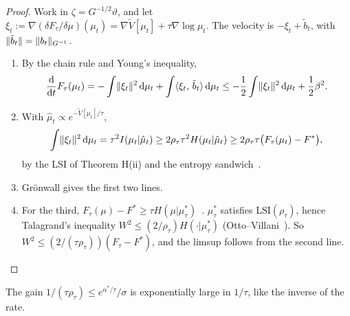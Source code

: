 \begin{proof}
Work in $\zeta=G^{-1/2}\vartheta$, and let
$\xi_t := \nabla(\delta F_\tau/\delta\mu)(\mu_t) = \nabla\tilde V[\mu_t] + \tau\nabla\log\mu_t$. The velocity is
$-\xi_t+\tilde b_t$, with $\lVert \tilde b_t\rVert = \lVert b_t\rVert_{G^{-1}}$.
\begin{enumerate}[label=\arabic*.]
  \item By the chain rule and Young's inequality,
    \[
      \frac{\mathrm{d}}{\mathrm{d}t}F_\tau(\mu_t) = -\int\lVert \xi_t\rVert^2\,\mathrm{d}\mu_t + \int\langle \xi_t,\, \tilde b_t\rangle\,\mathrm{d}\mu_t
      \le -\frac12\int\lVert \xi_t\rVert^2\,\mathrm{d}\mu_t + \frac12\beta^2.
    \]
  \item With $\hat\mu_t\propto e^{-\tilde V[\mu_t]/\tau}$,
    \[
      \int\lVert \xi_t\rVert^2\,\mathrm{d}\mu_t = \tau^2 I(\mu_t|\hat\mu_t) \ge 2\rho_\tau\tau^2 H(\mu_t|\hat\mu_t)
      \ge 2\rho_\tau\tau\bigl(F_\tau(\mu_t)-F^*\bigr),
    \]
    by the LSI of Theorem H(ii) and the entropy sandwich~\cite[Lemma~3.4]{S3}.
  \item Grönwall gives the first two lines.
  \item For the third, $F_\tau(\mu)-F^*\ge\tau H(\mu|\mu^*_\tau)$~\cite[Lemma~3.4]{S3}. $\mu^*_\tau$ satisfies
    $\mathrm{LSI}(\rho_\tau)$, hence Talagrand's inequality $W^2\le(2/\rho_\tau)H(\cdot|\mu^*_\tau)$
    (Otto--Villani~\cite{ov2000}). So $W^2\le(2/(\tau\rho_\tau))(F_\tau-F^*)$, and the limsup follows from the second
    line.\qedhere
\end{enumerate}
\end{proof}

The gain $1/(\tau\rho_\tau)\le e^{\alpha^*/\tau}/\sigma$ is exponentially large in $1/\tau$, like the inverse of the
rate.

